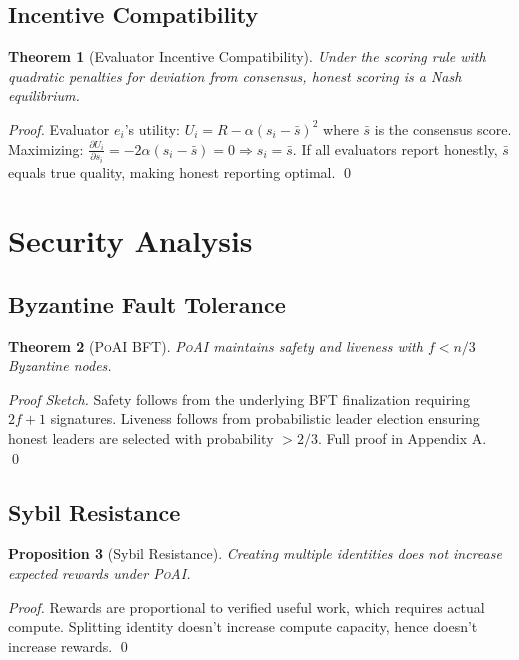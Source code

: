 \documentclass[11pt,letterpaper]{article}
\newtheorem{theorem}{Theorem}[section]
\newtheorem{proposition}[theorem]{Proposition}
\newcommand{\PoAI}{\textsc{PoAI}}
\begin{document}
\subsection{Incentive Compatibility}

\begin{theorem}[Evaluator Incentive Compatibility]
Under the scoring rule with quadratic penalties for deviation from consensus, honest scoring is a Nash equilibrium.
\end{theorem}

\begin{proof}
Evaluator $e_i$'s utility: $U_i = R - \alpha(s_i - \bar{s})^2$ where $\bar{s}$ is the consensus score. Maximizing: $\frac{\partial U_i}{\partial s_i} = -2\alpha(s_i - \bar{s}) = 0 \Rightarrow s_i = \bar{s}$. If all evaluators report honestly, $\bar{s}$ equals true quality, making honest reporting optimal. \qed
\end{proof}

\section{Security Analysis}
\label{sec:security}

\subsection{Byzantine Fault Tolerance}

\begin{theorem}[\PoAI{} BFT]
\PoAI{} maintains safety and liveness with $f < n/3$ Byzantine nodes.
\end{theorem}

\begin{proof}[Proof Sketch]
Safety follows from the underlying BFT finalization requiring $2f+1$ signatures. Liveness follows from probabilistic leader election ensuring honest leaders are selected with probability $> 2/3$. Full proof in Appendix A. \qed
\end{proof}

\subsection{Sybil Resistance}

\begin{proposition}[Sybil Resistance]
Creating multiple identities does not increase expected rewards under \PoAI{}.
\end{proposition}

\begin{proof}
Rewards are proportional to verified useful work, which requires actual compute. Splitting identity doesn't increase compute capacity, hence doesn't increase rewards. \qed
\end{proof}
\end{document}
